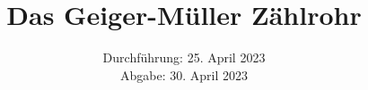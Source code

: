 

\subject{\texorpdfstring{\vspace{2ex}}{}V703\texorpdfstring{\vspace{-2ex}}{}} %
\title{Das Geiger-Müller Zählrohr} %
\date{
	Durchführung: 25. April 2023 %
	\\ Abgabe: 30. April 2023 %
}




\maketitle
\thispagestyle{empty}


\tableofcontents
\newpage







\printbibliography{}

\newpage



